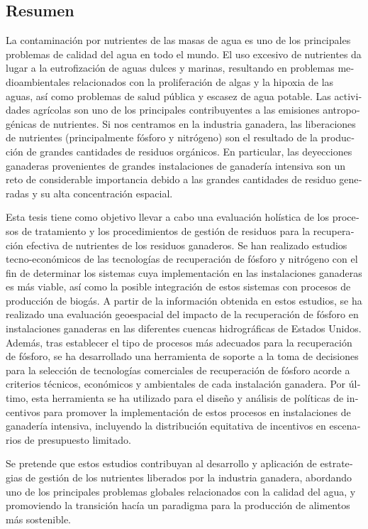 \begin{otherlanguage}{spanish}
\chapter*{Resumen}
La contaminación por nutrientes de las masas de agua es uno de los principales problemas de calidad del agua en todo el mundo. El uso excesivo de nutrientes da lugar a la eutrofización de aguas dulces y marinas, resultando en problemas medioambientales relacionados con la proliferación de algas y la hipoxia de las aguas, así como problemas de salud pública y escasez de agua potable.
Las actividades agrícolas son uno de los principales contribuyentes a las emisiones antropogénicas de nutrientes. Si nos centramos en la industria ganadera, las liberaciones de nutrientes (principalmente fósforo y nitrógeno) son el resultado de la producción de grandes cantidades de residuos orgánicos. En particular, las deyecciones ganaderas provenientes de grandes instalaciones de ganadería intensiva son un reto de considerable importancia debido a las grandes cantidades de residuo generadas y su alta concentración espacial. 

Esta tesis tiene como objetivo llevar a cabo una evaluación holística de los procesos de tratamiento y los procedimientos de gestión de residuos para la recuperación efectiva de nutrientes de los residuos ganaderos. Se han realizado estudios tecno-económicos de las tecnologías de recuperación de fósforo y nitrógeno con el fin de determinar los sistemas cuya implementación en las instalaciones ganaderas es más viable, así como la posible integración de estos sistemas con procesos de producción de biogás. A partir de la información obtenida en estos estudios, se ha realizado una evaluación geoespacial del impacto de la recuperación de fósforo 
en instalaciones ganaderas en las diferentes cuencas hidrográficas de Estados Unidos. Además, tras establecer el tipo de procesos más adecuados para la recuperación de fósforo, se ha desarrollado una herramienta de soporte a la toma de decisiones para la selección de tecnologías comerciales de recuperación de fósforo acorde a criterios técnicos, económicos y ambientales de cada instalación ganadera. Por último, esta herramienta se ha utilizado para el diseño y análisis de políticas de incentivos para promover la implementación de estos procesos
en instalaciones de ganadería intensiva, incluyendo la distribución equitativa de incentivos en escenarios de presupuesto limitado.

Se pretende que estos estudios contribuyan al desarrollo y aplicación de estrategias de gestión de los nutrientes liberados por la industria ganadera, abordando uno de los principales problemas globales relacionados con la calidad del agua, y promoviendo la transición hacía un paradigma para la producción de alimentos más sostenible.
\end{otherlanguage}


\vfill
